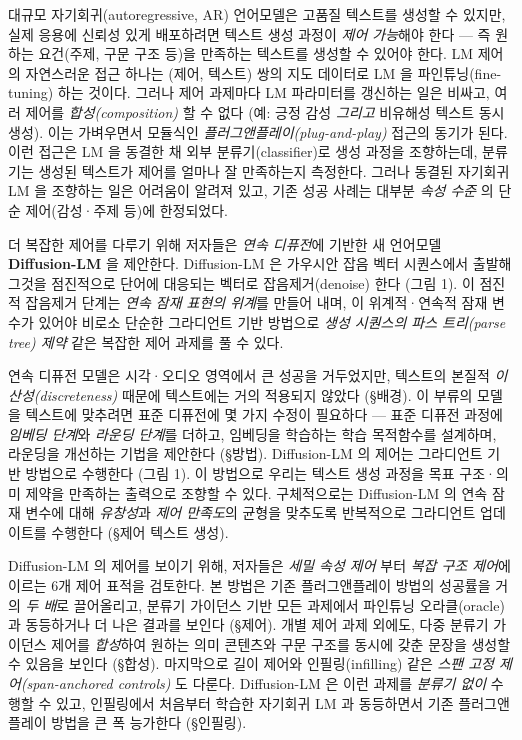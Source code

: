\documentclass[
]{article}
\begin{document}
대규모 자기회귀(autoregressive, AR) 언어모델은 고품질 텍스트를 생성할 수
있지만, 실제 응용에 신뢰성 있게 배포하려면 텍스트 생성 과정이 \emph{제어
가능}해야 한다 --- 즉 원하는 요건(주제, 구문 구조 등)을 만족하는
텍스트를 생성할 수 있어야 한다. LM 제어의 자연스러운 접근 하나는 (제어,
텍스트) 쌍의 지도 데이터로 LM 을 파인튜닝(fine-tuning) 하는 것이다.
그러나 제어 과제마다 LM 파라미터를 갱신하는 일은 비싸고, 여러 제어를
\emph{합성(composition)} 할 수 없다 (예: 긍정 감성 \emph{그리고}
비유해성 텍스트 동시 생성). 이는 가벼우면서 모듈식인
\emph{플러그앤플레이(plug-and-play)} 접근의 동기가 된다. 이런 접근은 LM
을 동결한 채 외부 분류기(classifier)로 생성 과정을 조향하는데, 분류기는
생성된 텍스트가 제어를 얼마나 잘 만족하는지 측정한다. 그러나 동결된
자기회귀 LM 을 조향하는 일은 어려움이 알려져 있고, 기존 성공 사례는
대부분 \emph{속성 수준} 의 단순 제어(감성·주제 등)에 한정되었다.

더 복잡한 제어를 다루기 위해 저자들은 \emph{연속 디퓨전}에 기반한 새
언어모델 \textbf{Diffusion-LM} 을 제안한다. Diffusion-LM 은 가우시안
잡음 벡터 시퀀스에서 출발해 그것을 점진적으로 단어에 대응되는 벡터로
잡음제거(denoise) 한다 (그림 1). 이 점진적 잡음제거 단계는 \emph{연속
잠재 표현의 위계}를 만들어 내며, 이 위계적·연속적 잠재 변수가 있어야
비로소 단순한 그라디언트 기반 방법으로 \emph{생성 시퀀스의 파스
트리(parse tree) 제약} 같은 복잡한 제어 과제를 풀 수 있다.

연속 디퓨전 모델은 시각·오디오 영역에서 큰 성공을 거두었지만, 텍스트의
본질적 \emph{이산성(discreteness)} 때문에 텍스트에는 거의 적용되지
않았다 (§배경). 이 부류의 모델을 텍스트에 맞추려면 표준 디퓨전에 몇 가지
수정이 필요하다 --- 표준 디퓨전 과정에 \emph{임베딩 단계}와 \emph{라운딩
단계}를 더하고, 임베딩을 학습하는 학습 목적함수를 설계하며, 라운딩을
개선하는 기법을 제안한다 (§방법). Diffusion-LM 의 제어는 그라디언트 기반
방법으로 수행한다 (그림 1). 이 방법으로 우리는 텍스트 생성 과정을 목표
구조·의미 제약을 만족하는 출력으로 조향할 수 있다. 구체적으로는
Diffusion-LM 의 연속 잠재 변수에 대해 \emph{유창성}과 \emph{제어
만족도}의 균형을 맞추도록 반복적으로 그라디언트 업데이트를 수행한다
(§제어 텍스트 생성).

Diffusion-LM 의 제어를 보이기 위해, 저자들은 \emph{세밀 속성 제어} 부터
\emph{복잡 구조 제어}에 이르는 6개 제어 표적을 검토한다. 본 방법은 기존
플러그앤플레이 방법의 성공률을 거의 \emph{두 배}로 끌어올리고, 분류기
가이던스 기반 모든 과제에서 파인튜닝 오라클(oracle)과 동등하거나 더 나은
결과를 보인다 (§제어). 개별 제어 과제 외에도, 다중 분류기 가이던스
제어를 \emph{합성}하여 원하는 의미 콘텐츠와 구문 구조를 동시에 갖춘
문장을 생성할 수 있음을 보인다 (§합성). 마지막으로 길이 제어와
인필링(infilling) 같은 \emph{스팬 고정 제어(span-anchored controls)} 도
다룬다. Diffusion-LM 은 이런 과제를 \emph{분류기 없이} 수행할 수 있고,
인필링에서 처음부터 학습한 자기회귀 LM 과 동등하면서 기존 플러그앤플레이
방법을 큰 폭 능가한다 (§인필링).
\end{document}
